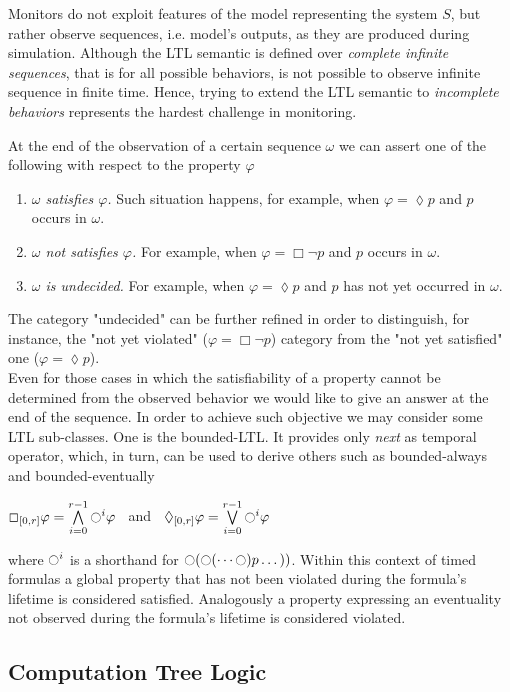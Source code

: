 Monitors do not exploit features of the model representing the system $S$, but rather observe sequences, i.e. model's outputs, as they are produced during simulation. Although the LTL semantic is defined over \textit{complete infinite sequences}, that is for all possible behaviors, is not possible to observe infinite sequence in finite time. Hence, trying to extend the LTL semantic to \textit{incomplete behaviors} represents the hardest challenge in monitoring.
\par At the end of the observation of a certain sequence $\omega$ we can assert one of the following with respect to the property $\varphi$
\begin{enumerate}
\item \textit{$\omega$ satisfies $\varphi$.} Such situation happens, for example, when $\varphi=\lozenge p$ and $p$ occurs in $\omega$.
\item \textit{$\omega$ not satisfies $\varphi$.} For example, when $\varphi=\Box \neg p$ and $p$ occurs in $\omega$.
\item \textit{$\omega$ is undecided.} For example, when $\varphi=\lozenge p$ and $p$ has not yet occurred in $\omega$.
\end{enumerate}
The category "undecided" can be further refined in order to distinguish, for instance, the "not yet violated" ($\varphi=\Box \neg p$) category from the "not yet satisfied" one ($\varphi=\lozenge p$).\\
Even for those cases in which the satisfiability of a property cannot be determined from the observed behavior we would like to give an answer at the end of the sequence. In order to achieve such objective we may consider some LTL sub-classes. One is the bounded-LTL. It provides only \textit{next} as temporal operator, which, in turn, can be used to derive others such as bounded-always and bounded-eventually
\begin{center}
$ \Box_{[0,r]}\varphi = \bigwedge  \limits_{i=0}^{r-1} \ocircle^i \varphi\;\;$ and $\;\;\lozenge_{[0,r]}\varphi = \bigvee  \limits_{i=0}^{r-1} \ocircle^i \varphi$
\end{center}
where $\ocircle^i$ is a shorthand for $\ocircle(\ocircle(\dots\ocircle)p\dots))$. Within this context of timed formulas a global property that has not been violated during the formula's lifetime is considered satisfied. Analogously a property expressing an eventuality not observed during the formula's lifetime is considered violated.

\subsection{Computation Tree Logic}

